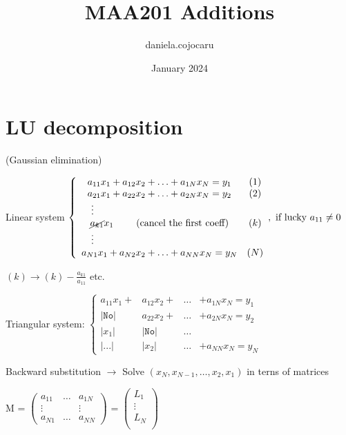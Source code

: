 \documentclass{article}
\title{MAA201 Additions}
\author{daniela.cojocaru}
\date{January 2024}
\begin{document}
\maketitle

\section{LU decomposition}
(Gaussian elimination)

Linear system
$\left\{\begin{array}{cc}
    a_{11} x_1 + a_{12} x_2 + \ldots + a_{1N}x_N = y_1 & (1)  \\
    a_{21} x_1 + a_{22} x_2 + \ldots + a_{2N}x_N = y_2 & (2) \\
    \multicolumn{2}{l}{\quad\vdots} \\
    \cancel{a_{k1}}x_1 \qquad\text{ (cancel the first coeff)} & (k) \\ %
    \multicolumn{2}{l}{\quad\vdots} \\
    a_{N1}x_1 + a_{N2} x_2 + \ldots + a_{NN}x_N = y_N & (N)
\end{array}, \text{ if lucky } a_{11} \neq 0 \right.$ \\

\vspace{10pt}

$(k) \rightarrow (k) - \displaystyle\frac{a_{k1}}{a_{11}}$ etc.

\vspace{10pt}

Triangular system:
$\left\{\begin{array}{cccc}
    a_{11}x_1 + &a_{12}x_2 + &\ldots &+ a_{1N}x_N = y_1 \\
    \left| \texttt{No} \right| &a_{22}x_2 + &\ldots &+ a_{2N}x_N = y_2 \\
    \left| x_1\right|  &\left|\texttt{No}\right|  &\ldots \\
    \left|...\right|  &\left|x_2\right| &\ldots &+ a_{NN}x_N = y_N
\end{array}\right.$

\vspace{10pt}

Backward substitution
$\rightarrow$ Solve $(x_N, x_{N-1},\ldots,x_2, x_1)$ in terns of matrices

\vspace{10pt}

M = 
$\left(\begin{array}{ccc}
    a_{11} & \ldots & a_{1N} \\
    \vdots & & \vdots \\
    a_{N1} & \ldots & a_{NN}
\end{array}\right)$
=
$\left(\begin{array}{c}
    L_1 \\
    \vdots \\
    L_N \\
\end{array}\right)$
\end{document}
